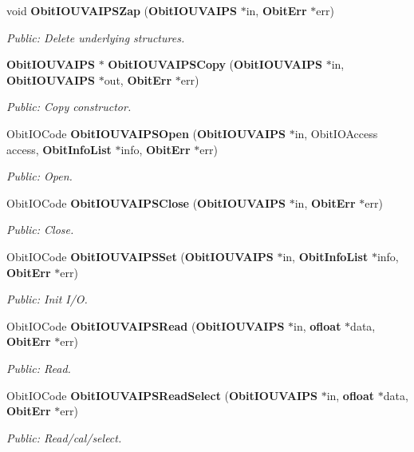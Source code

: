 \begin{CompactItemize}
void {\bf Obit\-IOUVAIPSZap} ({\bf Obit\-IOUVAIPS} $\ast$in, {\bf Obit\-Err} $\ast$err)
\begin{CompactList}\small\item\em Public: Delete underlying structures. \item\end{CompactList}\item 
{\bf Obit\-IOUVAIPS} $\ast$ {\bf Obit\-IOUVAIPSCopy} ({\bf Obit\-IOUVAIPS} $\ast$in, {\bf Obit\-IOUVAIPS} $\ast$out, {\bf Obit\-Err} $\ast$err)
\begin{CompactList}\small\item\em Public: Copy constructor. \item\end{CompactList}\item 
Obit\-IOCode {\bf Obit\-IOUVAIPSOpen} ({\bf Obit\-IOUVAIPS} $\ast$in, Obit\-IOAccess access, {\bf Obit\-Info\-List} $\ast$info, {\bf Obit\-Err} $\ast$err)
\begin{CompactList}\small\item\em Public: Open. \item\end{CompactList}\item 
Obit\-IOCode {\bf Obit\-IOUVAIPSClose} ({\bf Obit\-IOUVAIPS} $\ast$in, {\bf Obit\-Err} $\ast$err)
\begin{CompactList}\small\item\em Public: Close. \item\end{CompactList}\item 
Obit\-IOCode {\bf Obit\-IOUVAIPSSet} ({\bf Obit\-IOUVAIPS} $\ast$in, {\bf Obit\-Info\-List} $\ast$info, {\bf Obit\-Err} $\ast$err)
\begin{CompactList}\small\item\em Public: Init I/O. \item\end{CompactList}\item 
Obit\-IOCode {\bf Obit\-IOUVAIPSRead} ({\bf Obit\-IOUVAIPS} $\ast$in, {\bf ofloat} $\ast$data, {\bf Obit\-Err} $\ast$err)
\begin{CompactList}\small\item\em Public: Read. \item\end{CompactList}\item 
Obit\-IOCode {\bf Obit\-IOUVAIPSRead\-Select} ({\bf Obit\-IOUVAIPS} $\ast$in, {\bf ofloat} $\ast$data, {\bf Obit\-Err} $\ast$err)
\begin{CompactList}\small\item\em Public: Read/cal/select. \item\end{CompactList}\item 

\end{CompactItemize}

